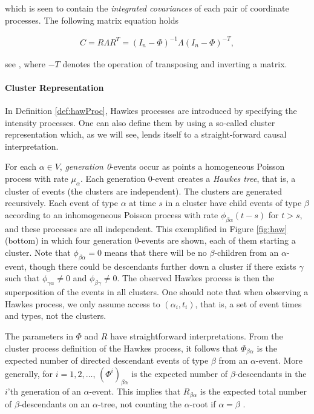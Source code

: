 \documentclass[accepted]{uai2021} %
\begin{document}
which is seen to contain the \emph{integrated covariances} of each pair of 
coordinate processes. The following matrix equation holds 
\citep{jovanovic2015,	 
achab2017}


\begin{align}
	C = R \Lambda R^T = (I_n - \Phi)^{-1}\Lambda(I_n - \Phi)^{-T},
	\label{eq:covarEq}
\end{align}


see \cite{jovanovic2015}, where $-T$ denotes the operation of transposing and 
inverting a matrix.


\paragraph{Cluster Representation}

In Definition \ref{def:hawProc}, Hawkes processes are introduced by specifying 
the intensity processes. One can also define them by using a so-called cluster 
representation which, as we will see, lends itself to a straight-forward causal 
interpretation.

For each $\alpha\in V$, \emph{generation 0}-events occur as points a 
homogeneous Poisson process with rate $\mu_\alpha$. Each generation 0-event 
creates a \emph{Hawkes tree}, that is, a cluster of events (the clusters are 
independent). The clusters are generated recursively. Each event of type 
$\alpha$ at time $s$ in a cluster have child events of type $\beta$ according 
to an inhomogeneous Poisson process with rate $\phi_{\beta\alpha}(t-s)$ for $t 
> s$, and these processes are all independent. This exemplified in Figure 
\ref{fig:haw} (bottom) in which four 
generation 0-events are shown, each of them starting a cluster. Note that 
$\phi_{\beta\alpha} = 0$ means that there will be no $\beta$-children from an 
$\alpha$-event, though there could be descendants further down a cluster if 
there exists $\gamma$ such that $\phi_{\gamma\alpha} \neq 0$ and 
$\phi_{\beta\gamma} \neq 0$. The observed Hawkes process is then the 
superposition of the events in all clusters. One should note that when 
observing a Hawkes process, we only assume access to 
$(\alpha_i, t_i)$, that is, a set of event times and types, not the clusters.

The parameters in $\Phi$ and $R$ have straightforward interpretations. From the 
cluster process definition of the Hawkes process, it follows that 
$\Phi_{\beta\alpha}$ is the 
expected number of directed descendant events of type $\beta$ from an 
$\alpha$-event. More generally, for $i = 1,2,\ldots$, 
$(\Phi^i)_{\beta\alpha}$ is the 
expected number of $\beta$-descendants in the $i$'th generation of an 
$\alpha$-event. This implies that $R_{\beta\alpha}$ is the expected total 
number of $\beta$-descendants on an $\alpha$-tree, not counting the 
$\alpha$-root if $\alpha=\beta$
\citep{jovanovic2015}.
\end{document}
